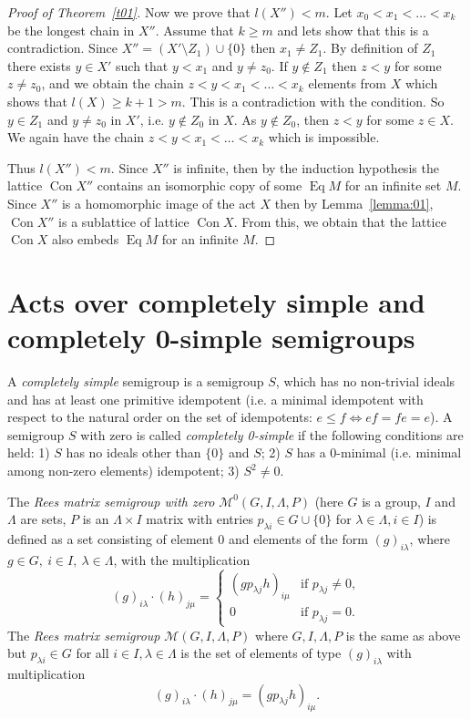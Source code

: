 \documentclass{birkau}
\numberwithin{equation}{section}
\theoremstyle{plain}
\theoremstyle{definition}
\DeclareMathOperator{\Con}{Con}
\DeclareMathOperator{\Eq}{Eq}
\begin{document}
\begin{proof}[Proof of Theorem~\ref{t01}]
		Now we prove that $l(X'') < m$. Let $ x_0 < x_1 < \ldots < x_k $ be the longest chain in $X''$. Assume that $k \geqslant m$ and lets show that this is a contradiction. Since $X'' = (X' \setminus Z_1) \cup \{0\}$ then $ x_1 \neq Z_1$. By definition of $Z_1$ there exists $y \in X'$ such that $y < x_1$ and $y \neq z_0$. If $y \notin Z_1$ then $z < y$ for some $z \neq z_0$, and we obtain the chain $z < y < x_1 < \ldots < x_k $ elements from $X$ which shows that $l(X) \geqslant k+1 > m$. This is a contradiction with the condition. So $y \in Z_1$ and $y \neq z_0$ in $X'$, i.e. $y \not \in Z_0$ in $X$. As $y \notin Z_0$, then $ z < y$ for some $z \in X$. We again have the chain $ z < y < x_1 < \ldots < x_k $ which is impossible.
		
		Thus $ l(X'') < m$. Since $X''$ is infinite, then by the induction hypothesis the lattice $\Con X''$ contains an isomorphic copy of some $\Eq M$ for an infinite set $M$. Since $X''$ is a homomorphic image of the act $X$ then by Lemma~\ref{lemma:01}, $\Con X''$ is a sublattice of lattice $\Con X$. From this, we obtain that the lattice $\Con X$ also embeds $\Eq M$ for an infinite $M$.
	\end{proof}
	
	\section{Acts over completely simple and completely 0-simple semigroups}
	
    A \textit{completely simple} semigroup is a semigroup $S$, which has no non-trivial ideals and has at least one primitive idempotent (i.e. a minimal idempotent with respect to the natural order on the set of idempotents: $e \leqslant f \Leftrightarrow ef=fe=e$). A semigroup $S$ with zero is called \textit{completely 0-simple} if the following conditions are held: 1) $S$ has no ideals other than $\{0\}$ and $S$; 2) $S$ has a 0-minimal (i.e. minimal among non-zero elements) idempotent; 3) $S^2 \neq 0$.
	
	The \textit{Rees matrix semigroup with zero} $\mathcal{M}^0(G,I,\Lambda,P)$ (here $G$ is a group, $I$ and $\Lambda$ are sets, $P$ is an $\Lambda \times I$ matrix with entries $p_{\lambda i} \in G \cup \{ 0\}$ for $\lambda \in \Lambda, i \in I$) is defined as a set consisting of element 0 and elements of the form $(g)_{i\lambda}$, where $g \in G,\ i \in I,\ \lambda \in \Lambda$, with the multiplication
		$$ (g)_{i\lambda} \cdot (h)_{j\mu} =
			\begin{cases}
				(gp_{\lambda j}h)_{i\mu} & \text{if } p_{\lambda j} \neq 0,\\
				0 & \text{if } p_{\lambda j} = 0.
			\end{cases}
		$$
	The \textit{Rees matrix semigroup} $\mathcal{M}(G,I,\Lambda,P)$ where $G,I,\Lambda,P$ is the same as above but $p_{\lambda i} \in G$ for all $i \in I,\lambda \in \Lambda$ is the set of elements of type $(g)_{i\lambda}$ with multiplication $$ (g)_{i\lambda} \cdot (h)_{j\mu} = (gp_{\lambda j}h)_{i\mu}. $$
	
\end{document}
